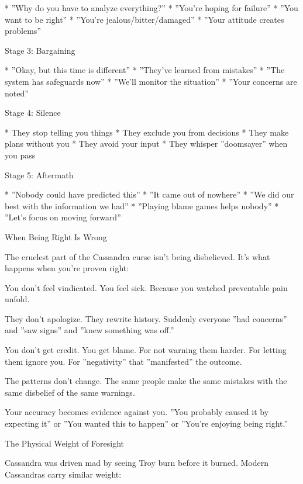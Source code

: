 \documentclass[12pt,oneside]{book}
\begin{document}
                    * ''Why do you have to analyze everything?''
                    * ''You're hoping for failure''
                    * ''You want to be right''
                    * ''You're jealous/bitter/damaged''
                    * ''Your attitude creates problems''

Stage 3: Bargaining

                    * ''Okay, but this time is different''
                    * ''They've learned from mistakes''
                    * ''The system has safeguards now''
                    * ''We'll monitor the situation''
                    * ''Your concerns are noted''

Stage 4: Silence

                    * They stop telling you things
                    * They exclude you from decisions
                    * They make plans without you
                    * They avoid your input
                    * They whisper ''doomsayer'' when you pass

Stage 5: Aftermath

                    * ''Nobody could have predicted this''
                    * ''It came out of nowhere''
                    * ''We did our best with the information we had''
                    * ''Playing blame games helps nobody''
                    * ''Let's focus on moving forward''

When Being Right Is Wrong

The cruelest part of the Cassandra curse isn't being disbelieved. It's what happens when you're proven right:

You don't feel vindicated. You feel sick. Because you watched preventable pain unfold.

They don't apologize. They rewrite history. Suddenly everyone ''had concerns'' and ''saw signs'' and ''knew something was off.''

You don't get credit. You get blame. For not warning them harder. For letting them ignore you. For ''negativity'' that ''manifested'' the outcome.

The patterns don't change. The same people make the same mistakes with the same disbelief of the same warnings.

Your accuracy becomes evidence against you. ''You probably caused it by expecting it'' or ''You wanted this to happen'' or ''You're enjoying being right.''

The Physical Weight of Foresight

Cassandra was driven mad by seeing Troy burn before it burned. Modern Cassandras carry similar weight:
\end{document}
